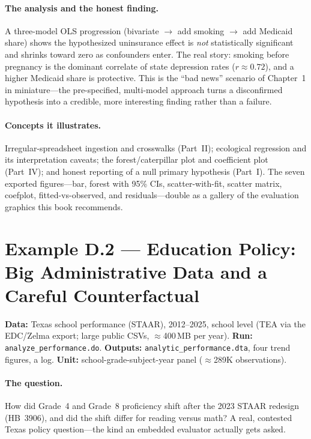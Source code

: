 \documentclass[
    a4paper,
    fontsize=10pt,
    twoside=true,
    numbers=noenddot,
]{kaobook}
\begin{document}
\paragraph{The analysis and the honest finding.} A three-model OLS progression (bivariate $\rightarrow$ add smoking $\rightarrow$ add Medicaid share) shows the hypothesized uninsurance effect is \emph{not} statistically significant and shrinks toward zero as confounders enter. The real story: smoking before pregnancy is the dominant correlate of state depression rates ($r \approx 0.72$), and a higher Medicaid share is protective. This is the \enquote{bad news} scenario of Chapter~1 in miniature---the pre-specified, multi-model approach turns a disconfirmed hypothesis into a credible, more interesting finding rather than a failure.

\paragraph{Concepts it illustrates.} Irregular-spreadsheet ingestion and crosswalks (Part~II); ecological regression and its interpretation caveats; the forest/caterpillar plot and coefficient plot (Part~IV); and honest reporting of a null primary hypothesis (Part~I). The seven exported figures---bar, forest with 95\% CIs, scatter-with-fit, scatter matrix, coefplot, fitted-vs-observed, and residuals---double as a gallery of the evaluation graphics this book recommends.

\section*{Example D.2 --- Education Policy: Big Administrative Data and a Careful Counterfactual}\label{app:edc}
\begin{kaobox}[frametitle=Get the files: \texttt{edc-3.0-texas/}]
\textbf{Data:} Texas school performance (STAAR), 2012--2025, school level (TEA via the EDC/Zelma export; large public CSVs, $\approx$400\,MB per year).
\textbf{Run:} \texttt{analyze\_performance.do}. \textbf{Outputs:} \texttt{analytic\_performance.dta}, four trend figures, a log.
\textbf{Unit:} school-grade-subject-year panel ($\approx$289K observations).
\end{kaobox}

\paragraph{The question.} How did Grade~4 and Grade~8 proficiency shift after the 2023 STAAR redesign (HB~3906), and did the shift differ for reading versus math? A real, contested Texas policy question---the kind an embedded evaluator actually gets asked.
\end{document}
